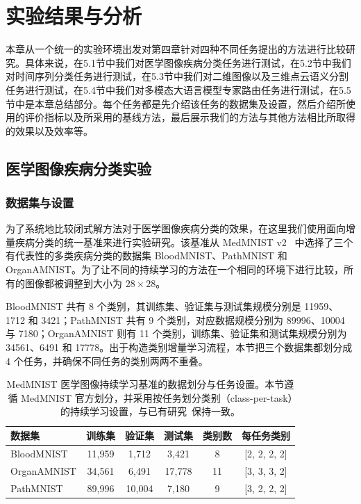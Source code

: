 \chapter{实验结果与分析}

本章从一个统一的实验环境出发对第四章针对四种不同任务提出的方法进行比较研究。具体来说，在5.1节中我们对医学图像疾病分类任务进行测试，在5.2节中我们对时间序列分类任务进行测试，在5.3节中我们对二维图像以及三维点云语义分割任务进行测试，在5.4节中我们对多模态大语言模型专家路由任务进行测试，在5.5节中是本章总结部分。每个任务都是先介绍该任务的数据集及设置，然后介绍所使用的评价指标以及所采用的基线方法，最后展示我们的方法与其他方法相比所取得的效果以及效率等。

\section{医学图像疾病分类实验}

\subsection{数据集与设置}

为了系统地比较闭式解方法对于医学图像疾病分类的效果，在这里我们使用面向增量疾病分类的统一基准来进行实验研究。该基准从 MedMNIST v2~\citep{yang2023medmnist} 中选择了三个有代表性的多类疾病分类的数据集 BloodMNIST、PathMNIST 和 OrganAMNIST。为了让不同的持续学习的方法在一个相同的环境下进行比较，所有的图像都被调整到大小为 $28\times 28$。

BloodMNIST 共有 8 个类别，其训练集、验证集与测试集规模分别是 11959、1712 和 3421；PathMNIST 共有 9 个类别，对应数据规模分别为 89996、10004 与 7180；OrganAMNIST 则有 11 个类别，训练集、验证集和测试集规模分别为 34561、6491 和 17778。出于构造类别增量学习流程，本节把三个数据集都划分成 4 个任务，并确保不同任务的类别两两不重叠。

\begin{table}[!htbp]
\centering
\caption{MedMNIST 医学图像持续学习基准的数据划分与任务设置。本节遵循 MedMNIST 官方划分，并采用按任务划分类别（class-per-task）的持续学习设置，与已有研究~\citep{derakhshani2022lifelonger}保持一致。}
\renewcommand{\arraystretch}{1.1}
\begin{tabular}{lccccc}
\toprule
数据集 & 训练集 & 验证集 & 测试集 & 类别数 & 每任务类别 \\
\midrule
BloodMNIST  & 11,959 & 1,712 & 3,421 & 8  & [2, 2, 2, 2] \\
OrganAMNIST & 34,561 & 6,491 & 17,778 & 11 & [3, 3, 3, 2] \\
PathMNIST   & 89,996 & 10,004 & 7,180 & 9 & [3, 2, 2, 2] \\
\bottomrule
\end{tabular}
\label{tab:medmnist_dataset}
\end{table}

